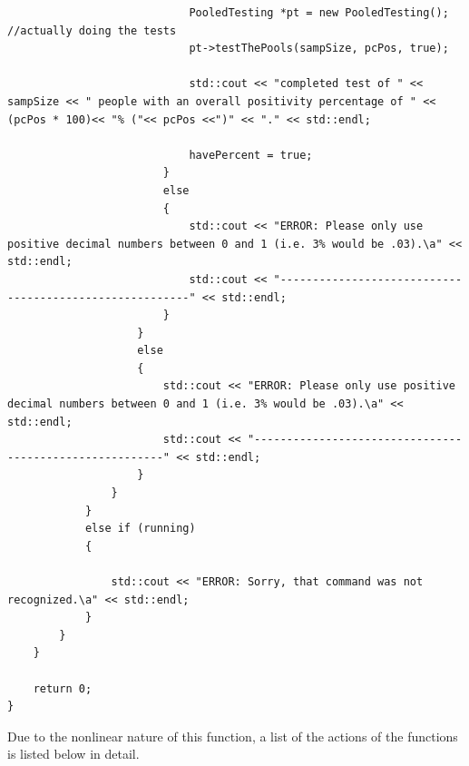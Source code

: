 \documentclass[letterpaper, 10pt]{article}
\begin{document}
\begin{addmargin}[-5em]{1em}
\begin{small}
\begin{verbatim}
                            PooledTesting *pt = new PooledTesting(); //actually doing the tests
                            pt->testThePools(sampSize, pcPos, true);

                            std::cout << "completed test of " << sampSize << " people with an overall positivity percentage of " << (pcPos * 100)<< "% ("<< pcPos <<")" << "." << std::endl;

                            havePercent = true;
                        }
                        else
                        {
                            std::cout << "ERROR: Please only use positive decimal numbers between 0 and 1 (i.e. 3% would be .03).\a" << std::endl;
                            std::cout << "--------------------------------------------------------" << std::endl;
                        }
                    }
                    else
                    {
                        std::cout << "ERROR: Please only use positive decimal numbers between 0 and 1 (i.e. 3% would be .03).\a" << std::endl;
                        std::cout << "--------------------------------------------------------" << std::endl;
                    }
                }
            }
            else if (running)
            {

                std::cout << "ERROR: Sorry, that command was not recognized.\a" << std::endl;
            }
        }
    }

    return 0;
}

\end{verbatim}
\end{small}
\end{addmargin}

Due to the nonlinear nature of this function, a list of the actions of the functions is listed below in detail.
\end{document}

